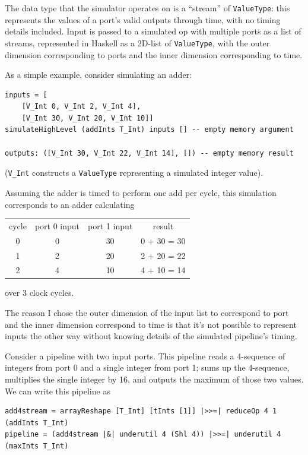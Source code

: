 \documentclass[12pt]{article}
\begin{document}
The data type that the simulator operates on is a ``stream'' of
\texttt{ValueType}: this represents the values of a port's valid
outputs through time, with no timing details included. Input is passed
to a simulated op with multiple ports as a list of streams,
represented in Haskell as a 2D-list of \texttt{ValueType}, with the
outer dimension corresponding to ports and the inner dimension
corresponding to time.

As a simple example, consider simulating an adder:

\begin{verbatim}
inputs = [
    [V_Int 0, V_Int 2, V_Int 4],
    [V_Int 30, V_Int 20, V_Int 10]]
simulateHighLevel (addInts T_Int) inputs [] -- empty memory argument

outputs: ([V_Int 30, V_Int 22, V_Int 14], []) -- empty memory result
\end{verbatim}

(\texttt{V\_Int} constructs a \texttt{ValueType} representing a
simulated integer value).

Assuming the adder is timed to perform one add per cycle, this simulation
corresponds to an adder calculating
\begin{center}
\begin{tabular}{c|c c|c}
cycle & port 0 input & port 1 input & result\\
0 & 0 & 30 & 0 + 30 = 30 \\
1 & 2 & 20 & 2 + 20 = 22 \\
2 & 4 & 10 & 4 + 10 = 14
\end{tabular}
\end{center}
over 3 clock cycles.

The reason I chose the outer dimension of the input list to correspond to
port and the inner dimension correspond to time is that it's not possible
to represent inputs the other way without knowing details of the simulated
pipeline's timing.

Consider a pipeline with two input ports. This pipeline reads a 4-sequence
of integers from port 0 and a single integer from port 1; sums up the
4-sequence, multiplies the single integer by 16, and outputs the
maximum of those two values. We can write this pipeline as

\begin{verbatim}
add4stream = arrayReshape [T_Int] [tInts [1]] |>>=| reduceOp 4 1 (addInts T_Int)
pipeline = (add4stream |&| underutil 4 (Shl 4)) |>>=| underutil 4 (maxInts T_Int)
\end{verbatim}
\end{document}
